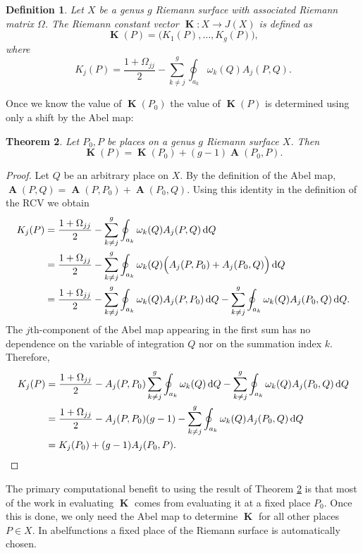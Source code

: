 \documentclass[12pt]{article}
\newtheorem{theorem}{Theorem}
\newtheorem{definition}[theorem]{Definition}
\theoremstyle{definition}
\newcommand{\dQ}{\,\mathrm{d}Q}
\DeclareMathOperator{\RCV}{\boldsymbol{K}}
\DeclareMathOperator{\Abel}{\boldsymbol{A}}
\begin{document}
\begin{definition} \label{def:rcv}
Let $X$ be a genus $g$ Riemann surface with associated Riemann matrix
$\Omega$. The Riemann constant vector $\RCV : X \to J(X)$ is defined as
\begin{equation} \label{eqn:rcv1}
  \RCV(P) = \big( K_1(P), \ldots, K_g(P) \big),
\end{equation}
where
\begin{equation} \label{eqn:rcv2}
  K_j(P) = \frac{1 + \Omega_{jj}}{2} - \sum_{k \neq j}^g
           \oint_{a_k} \omega_k(Q) A_j(P,Q).
\end{equation}
\end{definition}
Once we know the value of $\RCV(P_0)$ the value of $\RCV(P)$ is
determined using only a shift by the Abel map:
\begin{theorem} \label{thm:RCVshift}
  Let $P_0,P$ be places on a genus $g$ Riemann surface $X$. Then
  \begin{equation} \label{eqn:RCVshift}
    \RCV(P) = \RCV(P_0) + (g-1)\Abel(P_0,P).
  \end{equation}
\end{theorem}
\begin{proof}
Let $Q$ be an arbitrary place on $X$. By the definition of the Abel map,
$\Abel(P,Q) = \Abel(P,P_0) + \Abel(P_0,Q)$. Using this identity in the
definition of the RCV we obtain
\begin{align} \label{eqn:RCVshift1}
  K_j(P)
  &=
  \frac{1 + \Omega_{jj}}{2}
  -
  \sum_{k \neq j}^g
  \oint_{a_k} \omega_k(Q) A_j(P,Q) \dQ  \notag \\
  &=
  \frac{1 + \Omega_{jj}}{2}
  -
  \sum_{k \neq j}^g
  \oint_{a_k} \omega_k(Q) \Big( A_j(P,P_0) + A_j(P_0,Q) \Big) \dQ  \notag \\
  &=
  \frac{1 + \Omega_{jj}}{2}
  -
  \sum_{k \neq j}^g
  \oint_{a_k} \omega_k(Q) A_j(P,P_0) \dQ
  -
  \sum_{k \neq j}^g
  \oint_{a_k} \omega_k(Q) A_j(P_0,Q) \dQ.
\end{align}
The $j$th-component of the Abel map appearing in the first sum has no
dependence on the variable of integration $Q$ nor on the summation index
$k$. Therefore,
\begin{align} \label{eqn:RCVshift2}
  K_j(P)
  &=
  \frac{1 + \Omega_{jj}}{2}
  -
  A_j(P,P_0)
  \sum_{k \neq j}^g
  \oint_{a_k} \omega_k(Q) \dQ
  -
  \sum_{k \neq j}^g
  \oint_{a_k} \omega_k(Q) A_j(P_0,Q) \dQ \notag \\
  &=
  \frac{1 + \Omega_{jj}}{2}
  -
  A_j(P,P_0) (g-1)
  -
  \sum_{k \neq j}^g
  \oint_{a_k} \omega_k(Q) A_j(P_0,Q) \dQ \notag \\
  &=
  K_j(P_0) + (g-1)A_j(P_0,P).
\end{align}
\end{proof}
The primary computational benefit to using the result of Theorem
\ref{thm:RCVshift} is that most of the work in evaluating $\RCV$ comes
from evaluating it at a fixed place $P_0$. Once this is done, we only
need the Abel map to determine $\RCV$ for all other places $P \in X$. In
{\sc abelfunctions} a fixed place of the Riemann surface is
automatically chosen.
\end{document}

